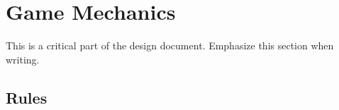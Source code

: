 \documentclass[12pt]{article}
\begin{document}







\section{Game Mechanics}

This is a critical part of the design document. Emphasize this section when writing.

\subsection{Rules}
\end{document}
